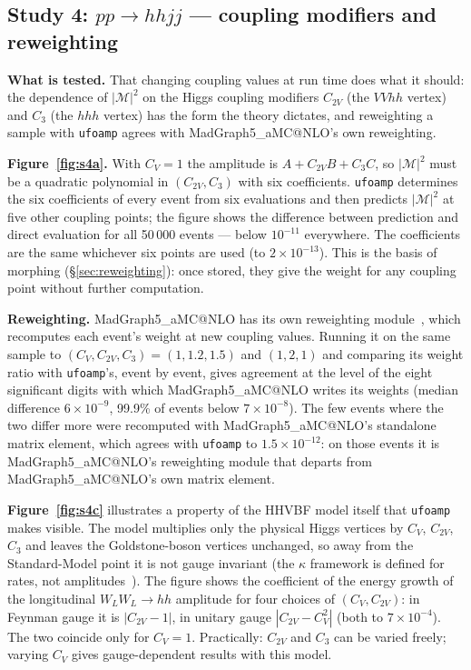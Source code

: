 \documentclass[11pt]{article}
\makeatletter
\newcommand{\ufoamp}{\texttt{ufoamp}}
\newcommand{\mg}{MadGraph5\_aMC@NLO}
\newcommand{\M}{\mathcal{M}}
\makeatother
\begin{document}
\subsection{Study 4: $pp\to hhjj$ --- coupling modifiers and reweighting}
\textbf{What is tested.} That changing coupling values at run time does what it should: the dependence of $|\M|^2$ on the Higgs coupling modifiers $C_{2V}$ (the $VVhh$ vertex) and $C_3$ (the $hhh$ vertex) has the form the theory dictates, and reweighting a sample with \ufoamp{} agrees with \mg's own reweighting.

\textbf{Figure~\ref{fig:s4a}.} With $C_V=1$ the amplitude is $A+C_{2V}B+C_3C$, so $|\M|^2$ must be a quadratic polynomial in $(C_{2V},C_3)$ with six coefficients. \ufoamp{} determines the six coefficients of every event from six evaluations and then predicts $|\M|^2$ at five other coupling points; the figure shows the difference between prediction and direct evaluation for all 50\,000 events --- below $10^{-11}$ everywhere. The coefficients are the same whichever six points are used (to $2\times10^{-13}$). This is the basis of morphing (\S\ref{sec:reweighting}): once stored, they give the weight for any coupling point without further computation.

\textbf{Reweighting.} \mg{} has its own reweighting module~\cite{Mattelaer:2016gcx}, which recomputes each event's weight at new coupling values. Running it on the same sample to $(C_V,C_{2V},C_3)=(1,1.2,1.5)$ and $(1,2,1)$ and comparing its weight ratio with \ufoamp's, event by event, gives agreement at the level of the eight significant digits with which \mg{} writes its weights (median difference $6\times10^{-9}$, 99.9\% of events below $7\times10^{-8}$). The few events where the two differ more were recomputed with \mg's standalone matrix element, which agrees with \ufoamp{} to $1.5\times10^{-12}$: on those events it is \mg's reweighting module that departs from \mg's own matrix element.

\textbf{Figure~\ref{fig:s4c}} illustrates a property of the HHVBF model itself that \ufoamp{} makes visible. The model multiplies only the physical Higgs vertices by $C_V$, $C_{2V}$, $C_3$ and leaves the Goldstone-boson vertices unchanged, so away from the Standard-Model point it is not gauge invariant (the $\kappa$ framework is defined for rates, not amplitudes~\cite{Heinemeyer:2013tqa}). The figure shows the coefficient of the energy growth of the longitudinal $W_LW_L\to hh$ amplitude for four choices of $(C_V,C_{2V})$: in Feynman gauge it is $|C_{2V}-1|$, in unitary gauge $|C_{2V}-C_V^2|$ (both to $7\times10^{-4}$). The two coincide only for $C_V=1$. Practically: $C_{2V}$ and $C_3$ can be varied freely; varying $C_V$ gives gauge-dependent results with this model.
\end{document}
